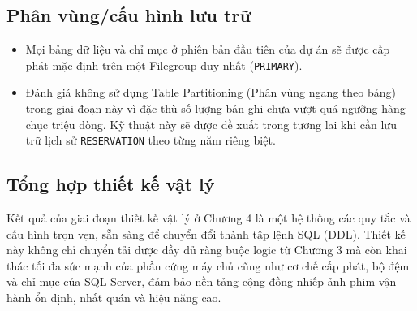 \subsection{Phân vùng/cấu hình lưu trữ}
\begin{itemize}
    \item Mọi bảng dữ liệu và chỉ mục ở phiên bản đầu tiên của dự án sẽ được cấp phát mặc định trên một Filegroup duy nhất (\texttt{PRIMARY}).
    \item Đánh giá không sử dụng Table Partitioning (Phân vùng ngang theo bảng) trong giai đoạn này vì đặc thù số lượng bản ghi chưa vượt quá ngưỡng hàng chục triệu dòng. Kỹ thuật này sẽ được đề xuất trong tương lai khi cần lưu trữ lịch sử \texttt{RESERVATION} theo từng năm riêng biệt.
\end{itemize}

\subsection{Tổng hợp thiết kế vật lý}
Kết quả của giai đoạn thiết kế vật lý ở Chương 4 là một hệ thống các quy tắc và cấu hình trọn vẹn, sẵn sàng để chuyển đổi thành tập lệnh SQL (DDL). Thiết kế này không chỉ chuyển tải được đầy đủ ràng buộc logic từ Chương 3 mà còn khai thác tối đa sức mạnh của phần cứng máy chủ cũng như cơ chế cấp phát, bộ đệm và chỉ mục của SQL Server, đảm bảo nền tảng cộng đồng nhiếp ảnh phim vận hành ổn định, nhất quán và hiệu năng cao.

